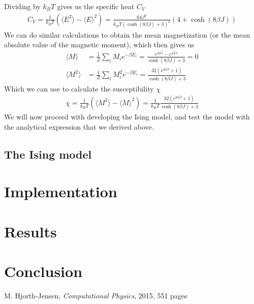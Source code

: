 \documentclass[12pt]{article}
\begin{document}
Dividing by $k_B T$ gives us the specific heat $C_V$
\begin{align*}
C_V = \frac{1}{k_BT} \left( \langle E^2 \rangle
- \langle E \rangle^2 \right) = \frac{64J^2}{k_B T(\cosh(8\beta J) + 3)^2}(4+\cosh(8\beta J))
\end{align*}
We can do similar calculations to obtain the mean magnetization (or the mean absolute value of the magnetic moment), which then gives us
\begin{align*}
\langle M\rangle &= \frac{1}{Z} \displaystyle \sum_i M_i e^{-\beta E_i} = \frac{e^{4\beta J} - e^{4\beta J}}{\cosh(8\beta J) + 3} = 0 \\
\langle M^2\rangle &= \frac{1}{Z}\displaystyle \sum_i M_i^2e^{-\beta E_i} = \frac{32(e^{8\beta J} + 1)}{\cosh(8\beta J) + 3}
\end{align*}
Which we can use to calculate the susceptibility $\chi$
\begin{align*}
\chi = \frac{1}{k_B T} \left(\langle M^2 \rangle - \langle M \rangle^2\right) = \frac{1}{k_B T} \frac{32(e^{8\beta J} + 1)}{\cosh(8\beta J) + 3}
\end{align*} 
We will now proceed with developing the Ising model, and test the model with the analytical expression that we derived above.
\FloatBarrier
\subsection{The Ising model}

\section{Implementation} \label{section:implement}

\section{Results} \label{section:result}

\section{Conclusion} \label{section:conclusion}

\FloatBarrier
\begin{thebibliography}{1}
     M. Hjorth-Jensen, \emph{Computational Physics}, 2015, 551 pages
\end{thebibliography}
\end{document}
